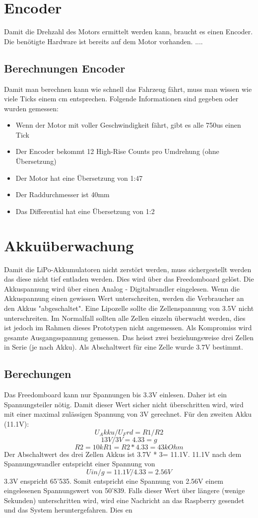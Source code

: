 \documentclass[a4paper, 10pt, fleqn]{article}
\begin{document}

\tableofcontents
\clearpage
\newpage
\section{Encoder}
Damit die Drehzahl des Motors ermittelt werden kann, braucht es einen Encoder. Die benötigte Hardware ist bereits auf dem Motor vorhanden. ....
\subsection{Berechnungen Encoder}
Damit man berechnen kann wie schnell das Fahrzeug fährt, muss man wissen wie viele Ticks einem cm entsprechen.
Folgende Informationen sind gegeben oder wurden gemessen:
\begin{itemize}
\item Wenn der Motor mit voller Geschwindigkeit fährt, gibt es alle 750us einen Tick
\item Der Encoder bekommt 12 High-Rise Counts pro Umdrehung (ohne Übersetzung)
\item Der Motor hat eine Übersetzung von 1:47
\item Der Raddurchmesser ist 40mm
\item Das Differential hat eine Übersetzung von 1:2
\end{itemize}

\section{Akkuüberwachung}
Damit die LiPo-Akkumulatoren nicht zerstört werden, muss sichergestellt werden das diese nicht tief entladen werden. Dies wird über das Freedomboard gelöst. Die Akkuspannung wird über einen Analog - Digitalwandler eingelesen. Wenn die Akkuspannung einen gewissen Wert unterschreiten, werden die Verbraucher an den Akkus "abgeschaltet". Eine Lipozelle sollte die Zellenspannung von 3.5V nicht unterschreiten. Im Normalfall sollten alle Zellen einzeln überwacht werden, dies ist jedoch im Rahmen dieses Prototypen nicht angemessen. Als Kompromiss wird gesamte Ausgangsspannung gemessen. Das heisst zwei beziehungsweise drei Zellen in Serie (je nach Akku). Als Abschaltwert für eine Zelle wurde 3.7V bestimmt.
\subsection{Berechungen}
Das Freedomboard kann nur Spannungen bis 3.3V einlesen. Daher ist ein Spannungsteiler nötig. Damit dieser Wert sicher nicht überschritten wird, wird mit einer maximal zulässigen Spannung von 3V gerechnet. 
Für den zweiten Akku (11.1V):
\[	U_Akku/U_Frd=R1/R2\]
\[	13V/3V=4.33=g\]
\[	R2=10k R1=R2*4.33=43kOhm\]
Der Abschaltwert des drei Zellen Akkus ist 3.7V * 3= 11.1V.
11.1V nach dem Spannungswandler entspricht einer Spannung von \[Uin/g=11.1V/4.33=2.56V\]
3.3V enspricht 65'535. Somit entspricht eine Spannung von 2.56V einem eingelesenen Spannungswert von 50'839. Falls dieser Wert über längere (wenige Sekunden) unterschritten wird, wird eine Nachricht an das Raspberry gesendet und das System heruntergefahren.
Dies en
\end{document}

